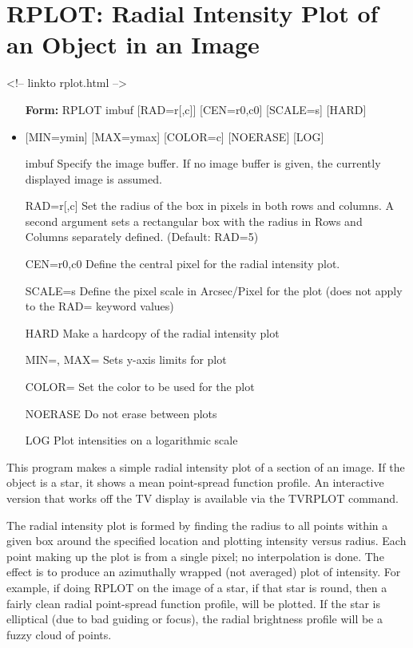 \section{RPLOT: Radial Intensity Plot of an Object in an Image}
\begin{rawhtml}
<!-- linkto rplot.html -->
\end{rawhtml}
\begin{itemize}
  \item[\textbf{Form: } RPLOT imbuf {[RAD=r{[,c]}]} {[CEN=r0,c0]} 
       {[SCALE=s]} {[HARD]}\hfill]{}
  \item{{[MIN=ymin]} {[MAX=ymax]} {[COLOR=c]} {[NOERASE]} {[LOG]}}
  \item[imbuf]{Specify the image buffer.  If no image buffer
       is given, the currently displayed image is assumed.}
  \item[RAD=r{[,c]}]{ Set the radius of the box in pixels in both rows 
        and columns.  A second argument sets a rectangular 
        box with the radius in Rows and Columns separately 
        defined.  (Default: RAD=5)}
  \item[CEN=r0,c0]{ Define the central pixel for the radial intensity
       plot.}
  \item[SCALE=s]{Define the pixel scale in Arcsec/Pixel for the plot
       (does not apply to the RAD= keyword values)}
  \item[HARD]{Make a hardcopy of the radial intensity plot }
  \item[MIN=, MAX=]{ Sets y-axis limits for plot}
  \item[COLOR=]{ Set the color to be used for the plot}
  \item[NOERASE]{ Do not erase between plots}
  \item[LOG]{ Plot intensities on a logarithmic scale}
\end{itemize}

This program makes a simple radial intensity plot of a section of an image.
If the object is a star, it shows a mean point-spread function profile.  An
interactive version that works off the TV display is available via the
TVRPLOT command.

The radial intensity plot is formed by finding the radius to all points
within a given box around the specified location and plotting intensity
versus radius.  Each point making up the plot is from a single pixel; no
interpolation is done.  The effect is to produce an azimuthally wrapped
(not averaged) plot of intensity.  For example, if doing RPLOT on the image
of a star, if that star is round, then a fairly clean radial point-spread
function profile, will be plotted.  If the star is elliptical (due to bad
guiding or focus), the radial brightness profile will be a fuzzy cloud of
points.

